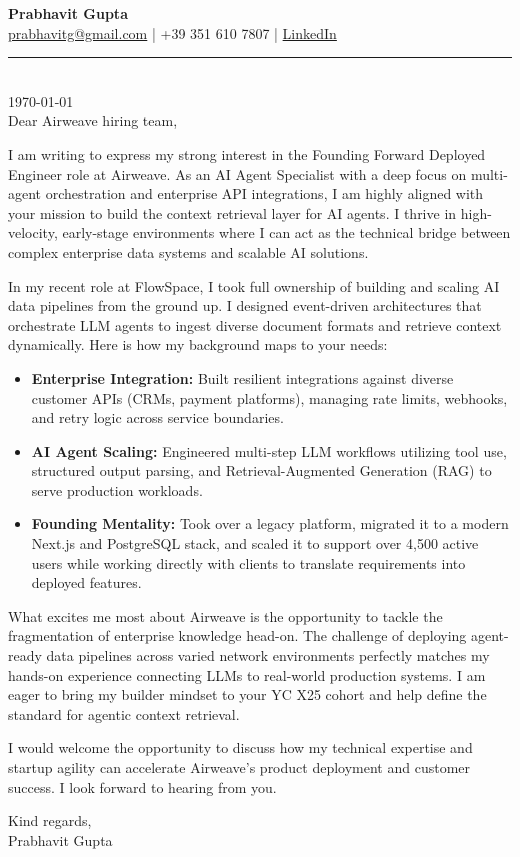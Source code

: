 \documentclass[11pt,a4paper]{article}
\begin{document}
{\Large \textbf{Prabhavit Gupta}} \\[1ex]
\href{mailto:prabhavitg@gmail.com}{prabhavitg@gmail.com} | +39 351 610 7807 | \href{https://www.linkedin.com/in/prabhavit/}{LinkedIn} \\[2ex]
\noindent\rule{\textwidth}{0.4pt} \\[2ex]

\today \\[2ex]

Dear Airweave hiring team,


I am writing to express my strong interest in the Founding Forward Deployed Engineer role at Airweave. As an AI Agent Specialist with a deep focus on multi-agent orchestration and enterprise API integrations, I am highly aligned with your mission to build the context retrieval layer for AI agents. I thrive in high-velocity, early-stage environments where I can act as the technical bridge between complex enterprise data systems and scalable AI solutions.


In my recent role at FlowSpace, I took full ownership of building and scaling AI data pipelines from the ground up. I designed event-driven architectures that orchestrate LLM agents to ingest diverse document formats and retrieve context dynamically. Here is how my background maps to your needs:


\begin{itemize}
    \item {\textbf{Enterprise Integration:} Built resilient integrations against diverse customer APIs (CRMs, payment platforms), managing rate limits, webhooks, and retry logic across service boundaries.}
    \item {\textbf{AI Agent Scaling:} Engineered multi-step LLM workflows utilizing tool use, structured output parsing, and Retrieval-Augmented Generation (RAG) to serve production workloads.}
    \item {\textbf{Founding Mentality:} Took over a legacy platform, migrated it to a modern Next.js and PostgreSQL stack, and scaled it to support over 4,500 active users while working directly with clients to translate requirements into deployed features.}
\end{itemize}
\vspace{6pt}

What excites me most about Airweave is the opportunity to tackle the fragmentation of enterprise knowledge head-on. The challenge of deploying agent-ready data pipelines across varied network environments perfectly matches my hands-on experience connecting LLMs to real-world production systems. I am eager to bring my builder mindset to your YC X25 cohort and help define the standard for agentic context retrieval.


I would welcome the opportunity to discuss how my technical expertise and startup agility can accelerate Airweave's product deployment and customer success. I look forward to hearing from you.


\begin{flushright}
Kind regards, \\[3ex]


Prabhavit Gupta

\end{flushright}
\end{document}
